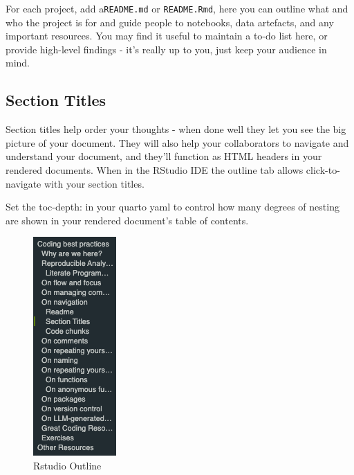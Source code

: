 \documentclass[
  letterpaper,
  DIV=11,
  numbers=noendperiod]{scrreprt}
\begin{document}
For each project, add a\texttt{README.md} or \texttt{README.Rmd}, here
you can outline what and who the project is for and guide people to
notebooks, data artefacts, and any important resources. You may find it
useful to maintain a to-do list here, or provide high-level findings -
it's really up to you, just keep your audience in mind.

\subsection{Section Titles}\label{section-titles}

Section titles help order your thoughts - when done well they let you
see the big picture of your document. They will also help your
collaborators to navigate and understand your document, and they'll
function as HTML headers in your rendered documents. When in the RStudio
IDE the outline tab allows click-to-navigate with your section titles.

\begin{tcolorbox}[enhanced jigsaw, colback=white, opacitybacktitle=0.6, coltitle=black, left=2mm, breakable, bottomtitle=1mm, toptitle=1mm, toprule=.15mm, colframe=quarto-callout-tip-color-frame, titlerule=0mm, title=\textcolor{quarto-callout-tip-color}{\faLightbulb}\hspace{0.5em}{Tip}, colbacktitle=quarto-callout-tip-color!10!white, rightrule=.15mm, bottomrule=.15mm, arc=.35mm, opacityback=0, leftrule=.75mm]

Set the toc-depth: in your quarto yaml to control how many degrees of
nesting are shown in your rendered document's table of contents.

\end{tcolorbox}

\begin{figure}[H]

{\centering \includegraphics{img/rstudio_outline.png}

}

\caption{Rstudio Outline}

\end{figure}%
\end{document}
